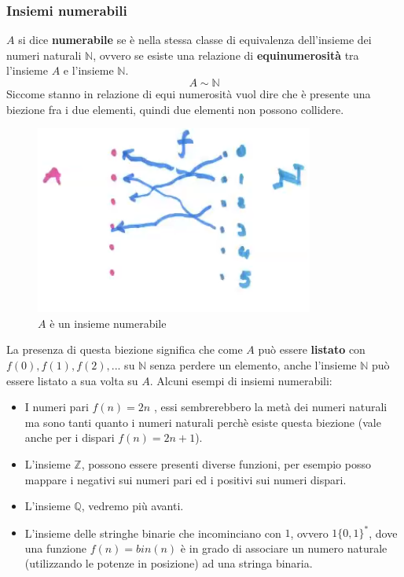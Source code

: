 \documentclass{article}
\begin{document}
\subsubsection{Insiemi numerabili}
$A$ si dice \textbf{numerabile} se è nella stessa classe di equivalenza dell'insieme dei numeri naturali
$\mathbb{N}$, ovvero se esiste una relazione di \textbf{equinumerosità} tra l'insieme $A$ e l'insieme $\mathbb{N}$.
$$A\sim\mathbb{N}$$
Siccome stanno in relazione di equi numerosità
vuol dire che è presente una biezione fra i due elementi, quindi due elementi non possono collidere.
\begin{figure}[H]
    \centering
    \includegraphics[scale=0.6]{images/A_numerabile_N.png}
    \caption{$A$ è un insieme numerabile}
\end{figure}
La presenza di questa biezione significa che come $A$ può essere \textbf{listato} con
$f(0),f(1),f(2),...$ su $\mathbb{N}$ senza perdere un elemento, anche l'insieme $\mathbb{N}$ può essere
listato a sua volta su $A$.
Alcuni esempi di insiemi numerabili:
\begin{itemize}
    \item I numeri pari $f(n)=2n$ , essi sembrerebbero la metà dei numeri naturali ma sono tanti quanto i numeri
          naturali perchè esiste questa biezione (vale anche per i dispari $f(n)=2n+1$).
    \item L'insieme $\mathbb{Z}$, possono essere presenti diverse funzioni, per esempio
          posso mappare i negativi sui numeri pari ed i positivi sui numeri dispari.
    \item L'insieme $\mathbb{Q}$, vedremo più avanti.
    \item L'insieme delle stringhe binarie che incominciano con $1$, ovvero $1\{0,1\}^*$,
          dove una funzione $f(n)=bin(n)$ è in grado di associare un numero naturale (utilizzando
          le potenze in posizione) ad una stringa binaria.
\end{itemize}
\end{document}
